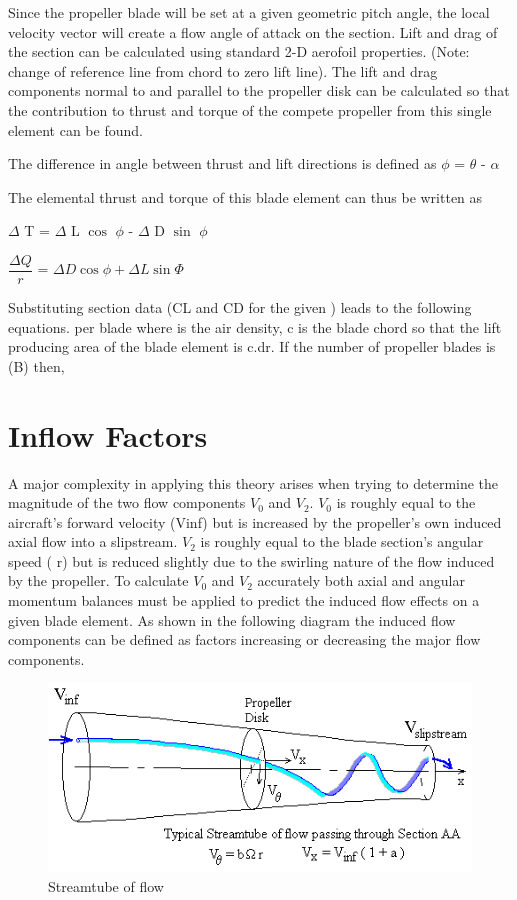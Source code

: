 Since the propeller blade will be set at a given geometric pitch angle, the local velocity vector will create a flow angle of attack on the section. Lift and drag of the section can be calculated using standard 2-D aerofoil properties. (Note: change of reference line from chord to zero lift line). The lift and drag components normal to and parallel to the propeller disk can be calculated so that the contribution to thrust and torque of the compete propeller from this single element can be found.

The difference in angle between thrust and lift directions is defined as 
$\phi$ = $\theta$ - $\alpha$

The elemental thrust and torque of this blade element can thus be written as

$\Delta$ T = $\Delta$ L $\cos$ $\phi$ - $\Delta$ D $\sin$ $\phi$

$\dfrac{\Delta Q}{r}$  = $\Delta D \cos \phi + \Delta L \sin \Phi$


Substituting section data (CL and CD for the given   ) leads to the following equations.
per blade
where  is the air density, c is the blade chord so that the lift producing area of the blade element is c.dr.
If the number of propeller blades is (B) then,

\section{Inflow Factors}
A major complexity in applying this theory arises when trying to determine the magnitude of the two flow components $V_{0}$ and $V_{2}$. $V_{0}$ is roughly equal to the aircraft's forward velocity (Vinf) but is increased by the propeller's own induced axial flow into a slipstream. $V_{2}$ is roughly equal to the blade section's angular speed ( r) but is reduced slightly due to the swirling nature of the flow induced by the propeller. To calculate $V_{0}$ and $V_{2}$ accurately both axial and angular momentum balances must be applied to predict the induced flow effects on a given blade element. As shown in the following diagram the induced flow components can be defined as factors increasing or decreasing the major flow components.
\begin{figure}[H]
	\centering
	\includegraphics[scale=.7]{blade3}
	\caption{Streamtube of flow}
	\label{figure}
\end{figure}

